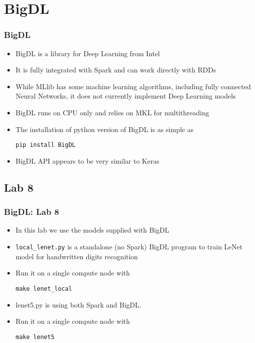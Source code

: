 \section{BigDL}

\begin{frame}[fragile]
  \frametitle{BigDL}
  \begin{itemize}
  \item {\color{mycolordef}BigDL} is a library for Deep Learning from Intel
  \item It is fully integrated with Spark and can work directly with RDDs
  \item While MLlib has some machine learning algorithms, 
    including fully connected Neural Networks, it does not currently implement Deep Learning models
  \item BigDL runs on CPU only and relies on MKL for multithreading
  \item The installation of python version of BigDL is as simple as 
    {\color{mycolorcli}
\begin{verbatim}
pip install BigDL
\end{verbatim}
    }
  \item BigDL API appears to be very similar to Keras
  \end{itemize}
\end{frame}


\subsection{Lab 8}
\begin{frame}[fragile]
  \frametitle{BigDL: Lab 8}
  \begin{itemize}
  \item In this lab we use the models supplied with BigDL
  \item {\color{mycolorcli}\verb|local_lenet.py|} is a standalone (no Spark) 
    BigDL program to train LeNet model for handwritten digits recognition
  \item Run it on a single compute node with
    {\color{mycolorcli}
\begin{verbatim}
make lenet_local
\end{verbatim}
    }
  \item {\color{mycolorcli}lenet5.py} is using both Spark and BigDL.
  \item Run it on a single compute node with
    {\color{mycolorcli}
\begin{verbatim}
make lenet5
\end{verbatim}
    }
\end{itemize}
\end{frame}


